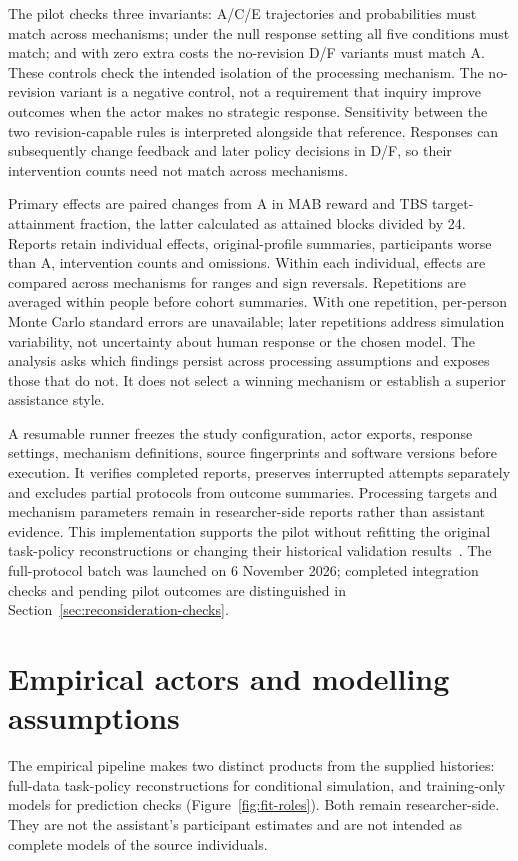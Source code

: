 \documentclass[11pt,a4paper]{article}
\begin{document}
The pilot checks three invariants: A/C/E trajectories and probabilities must match across mechanisms; under the null response setting all five conditions must match; and with zero extra costs the no-revision D/F variants must match A. These controls check the intended isolation of the processing mechanism. The no-revision variant is a negative control, not a requirement that inquiry improve outcomes when the actor makes no strategic response. Sensitivity between the two revision-capable rules is interpreted alongside that reference. Responses can subsequently change feedback and later policy decisions in D/F, so their intervention counts need not match across mechanisms.

Primary effects are paired changes from A in MAB reward and TBS target-attainment fraction, the latter calculated as attained blocks divided by 24. Reports retain individual effects, original-profile summaries, participants worse than A, intervention counts and omissions. Within each individual, effects are compared across mechanisms for ranges and sign reversals. Repetitions are averaged within people before cohort summaries. With one repetition, per-person Monte Carlo standard errors are unavailable; later repetitions address simulation variability, not uncertainty about human response or the chosen model. The analysis asks which findings persist across processing assumptions and exposes those that do not. It does not select a winning mechanism or establish a superior assistance style.

A resumable runner freezes the study configuration, actor exports, response settings, mechanism definitions, source fingerprints and software versions before execution. It verifies completed reports, preserves interrupted attempts separately and excludes partial protocols from outcome summaries. Processing targets and mechanism parameters remain in researcher-side reports rather than assistant evidence. This implementation supports the pilot without refitting the original task-policy reconstructions or changing their historical validation results~\cite{reconsiderationpilot}. The full-protocol batch was launched on 6 November 2026; completed integration checks and pending pilot outcomes are distinguished in Section~\ref{sec:reconsideration-checks}.

\section{Empirical actors and modelling assumptions}
\label{sec:empirical-actors}
The empirical pipeline makes two distinct products from the supplied histories: full-data task-policy reconstructions for conditional simulation, and training-only models for prediction checks (Figure~\ref{fig:fit-roles}). Both remain researcher-side. They are not the assistant's participant estimates and are not intended as complete models of the source individuals.
\end{document}
